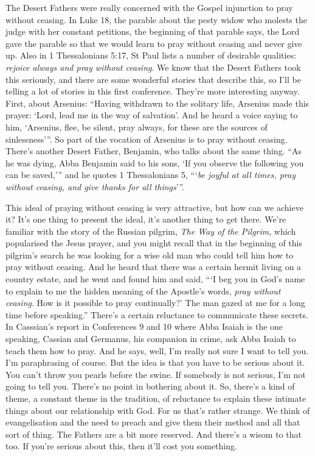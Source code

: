 The Desert Fathers were really concerned with the Gospel injunction to pray without ceasing. In Luke 18, the parable about the pesty widow who molests the judge with her constant petitions, the beginning of that parable says, the Lord gave the parable so that we would learn to pray without ceasing and never give up. Also in 1 Thessalonians 5:17, St Paul lists a number of desirable qualities: \emph{rejoice always and pray without ceasing}. We know that the Desert Fathers took this seriously, and there are some wonderful stories that describe this, so I'll be telling a lot of stories in this first conference. They're more interesting anyway. First, about Arsenius: ``Having withdrawn to the solitary life, Arsenius made this prayer: `Lord, lead me in the way of salvation'. And he heard a voice saying to him, `Arsenius, flee, be silent, pray always, for these are the sources of sinlessness'''. So part of the vocation of Arsenius is to pray without ceasing. There's another Desert Father, Benjamin, who talks about the same thing. ``As he was dying, Abba Benjamin said to his sons, `If you observe the following you can be saved,''' and he quotes 1 Thessalonians 5, ```\emph{be joyful at all times, pray without ceasing, and give thanks for all things}'''.

This ideal of praying without ceasing is very attractive, but how can we achieve it? It's one thing to present the ideal, it's another thing to get there. We're familiar with the story of the Russian pilgrim, \emph{The Way of the Pilgrim}, which popularised the Jesus prayer, and you might recall that in the beginning of this pilgrim's search he was looking for a wise old man who could tell him how to pray without ceasing. And he heard that there was a certain hermit living on a country estate, and he went and found him and said, ```I beg you in God's name to explain to me the hidden meaning of the Apostle's words, \emph{pray without ceasing}. How is it possible to pray continually?' The man gazed at me for a long time before speaking.'' There's a certain reluctance to communicate these secrets. In Casssian's report in Conferences 9 and 10 where Abba Isaiah is the one speaking, Cassian and Germanus, his companion in crime, ask Abba Isaiah to teach them how to pray. And he says, well, I'm really not sure I want to tell you. I'm paraphrasing of course. But the idea is that you have to be serious about it. You can't throw you pearls before the swine. If somebody is not serious, I'm not going to tell you. There's no point in bothering about it. So, there's a kind of theme, a constant theme in the tradition, of reluctance to explain these intimate things about our relationship with God. For us that's rather strange. We think of evangelisation and the need to preach and give them their method and all that sort of thing. The Fathers are a bit more reserved. And there's a wisom to that too. If you're serious about this, then it'll cost you something.


